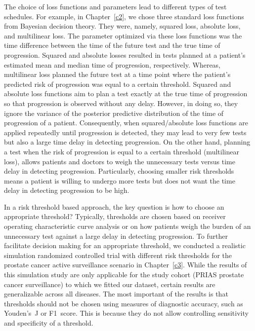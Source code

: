 The choice of loss functions and parameters lead to different types of test schedules. For example, in Chapter~\ref{c2}, we chose three standard loss functions from Bayesian decision theory. They were, namely, squared loss, absolute loss, and multilinear loss. The parameter optimized via these loss functions was the time difference between the time of the future test and the true time of progression. Squared and absolute losses resulted in tests planned at a patient's estimated mean and median time of progression, respectively. Whereas, multilinear loss planned the future test at a time point where the patient's predicted risk of progression was equal to a certain threshold. Squared and absolute loss functions aim to plan a test exactly at the true time of progression so that progression is observed without any delay. However, in doing so, they ignore the variance of the posterior predictive distribution of the time of progression of a patient. Consequently, when squared/absolute loss functions are applied repeatedly until progression is detected, they may lead to very few tests but also a large time delay in detecting progression. On the other hand, planning a test when the risk of progression is equal to a certain threshold (multilinear loss), allows patients and doctors to weigh the unnecessary tests versus time delay in detecting progression. Particularly, choosing smaller risk thresholds means a patient is willing to undergo more tests but does not want the time delay in detecting progression to be high.

In a risk threshold based approach, the key question is how to choose an appropriate threshold? Typically, thresholds are chosen based on receiver operating characteristic curve analysis or on how patients weigh the burden of an unnecessary test against a large delay in detecting progression. To further facilitate decision making for an appropriate threshold, we conducted a realistic simulation randomized controlled trial with different risk thresholds for the prostate cancer active surveillance scenario in Chapter~\ref{c3}. While the results of this simulation study are only applicable for the study cohort (PRIAS prostate cancer surveillance) to which we fitted our dataset, certain results are generalizable across all diseases. The most important of the results is that thresholds should not be chosen using measures of diagnostic accuracy, such as Youden's~J or F1~score. This is because they do not allow controlling sensitivity and specificity of a threshold.

